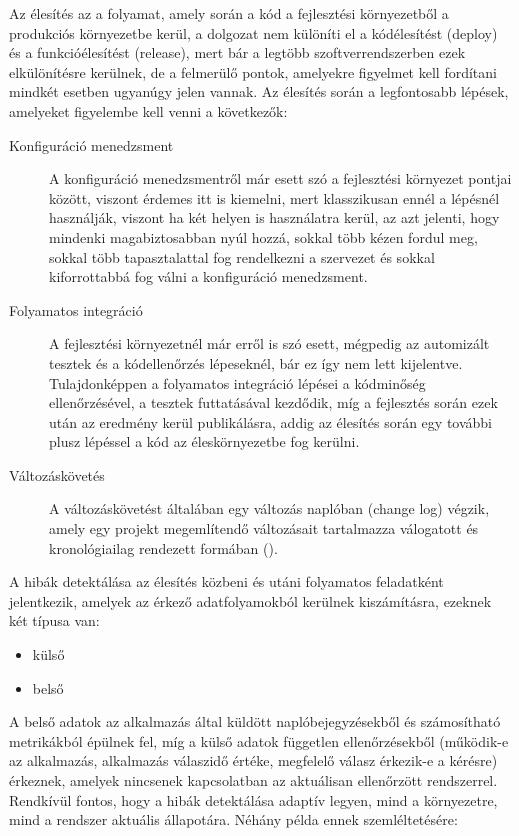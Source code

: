 Az élesítés az a folyamat, amely során a kód a fejlesztési környezetből a produkciós környezetbe kerül, a dolgozat nem különíti el a kódélesítést (deploy) és a funkcióélesítést (release), mert bár a legtöbb szoftverrendszerben ezek elkülönítésre kerülnek, de a felmerülő pontok, amelyekre figyelmet kell fordítani mindkét esetben ugyanúgy jelen vannak. Az élesítés során a legfontosabb lépések, amelyeket figyelembe kell venni a következők:
\begin{description}
  \item[Konfiguráció menedzsment]
  A konfiguráció menedzsmentről már esett szó a fejlesztési környezet pontjai között, viszont érdemes itt is kiemelni, mert klasszikusan ennél a lépésnél használják, viszont ha két helyen is használatra kerül, az azt jelenti, hogy mindenki magabiztosabban nyúl hozzá, sokkal több kézen fordul meg, sokkal több tapasztalattal fog rendelkezni a szervezet és sokkal kiforrottabbá fog válni a konfiguráció menedzsment.
  \item[Folyamatos integráció]
  A fejlesztési környezetnél már erről is szó esett, mégpedig az automizált tesztek és a kódellenőrzés lépeseknél, bár ez így nem lett kijelentve. Tulajdonképpen a folyamatos integráció lépései a kódminőség ellenőrzésével, a tesztek futtatásával kezdődik, míg a fejlesztés során ezek után az eredmény kerül publikálásra, addig az élesítés során egy további plusz lépéssel a kód az éleskörnyezetbe fog kerülni.
  \item[Változáskövetés]
  A változáskövetést általában egy változás naplóban (change log) végzik, amely egy projekt megemlítendő változásait tartalmazza válogatott és kronológiailag rendezett formában (\cite{keep_a_changelog}).
\end{description}

A hibák detektálása az élesítés közbeni és utáni folyamatos feladatként jelentkezik, amelyek az érkező adatfolyamokból kerülnek kiszámításra, ezeknek két típusa van:
\begin{itemize}
  \item külső
  \item belső
\end{itemize}

A belső adatok az alkalmazás által küldött naplóbejegyzésekből és számosítható metrikákból épülnek fel, míg a külső adatok független ellenőrzésekből (működik-e az alkalmazás, alkalmazás válaszidő értéke, megfelelő válasz érkezik-e a kérésre) érkeznek, amelyek nincsenek kapcsolatban az aktuálisan ellenőrzött rendszerrel. Rendkívül fontos, hogy a hibák detektálása adaptív legyen, mind a környezetre, mind a rendszer aktuális állapotára. Néhány példa ennek szemléltetésére:

